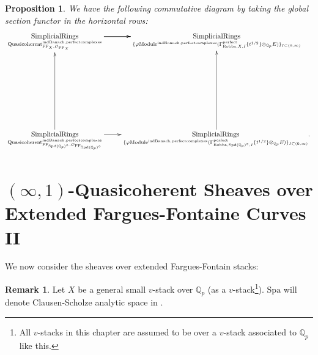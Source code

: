 \documentclass[12pt]{book}
\newtheorem{proposition}{Proposition}
\theoremstyle{definition}
\newtheorem{remark}{Remark}
\begin{document}
\begin{proposition}
We have the following commutative diagram by taking the global section functor in the horizontal rows:\\
\[\displayindent=+0in
\xymatrix@C+0in@R+7pc{
\underset{\mathrm{Quasicoherent}^{\mathrm{indBanach,perfectcomplexes}}_{\mathrm{FF}_X,\mathcal{O}_{\mathrm{FF}_X}}}{\mathrm{SimplicialRings}}  \ar[r] \ar[r] \ar[r] &\underset{\{\varphi\mathrm{Module}^{\mathrm{indBanach,perfectcomplexes}}(\Gamma^\text{perfect}_{\text{Robba},X,I}\{t^{1/2}\}\otimes_{\mathbb{Q}_p}E)\}_{I\subset (0,\infty)}}{\mathrm{SimplicialRings}}   \\
\underset{\mathrm{Quasicoherent}^{\mathrm{indBanach,perfectcomplexes}}_{\mathrm{FF}_{\mathrm{Spd}(\mathbb{Q}_p)^\diamond},\mathcal{O}_{\mathrm{FF}_{\mathrm{Spd}(\mathbb{Q}_p)^\diamond}}}}{\mathrm{SimplicialRings}} \ar[u]\ar[r] &\underset{\{\varphi\mathrm{Module}^{\mathrm{indBanach,perfectcomplexes}}(\Gamma^\text{perfect}_{\text{Robba},{\mathrm{Spd}(\mathbb{Q}_p)^\diamond},I}\{t^{1/2}\}\otimes_{\mathbb{Q}_p}E)\}_{I\subset (0,\infty)}}{\mathrm{SimplicialRings}}.\ar[u]  
}
\]

\end{proposition}





\newpage
\section{$(\infty,1)$-Quasicoherent Sheaves over Extended Fargues-Fontaine Curves II}

\noindent We now consider the sheaves over extended Fargues-Fontain stacks:

\begin{remark}
Let $X$ be a general small $v$-stack over $\mathbb{Q}_p$ (as a $v$-stack\footnote{All $v$-stacks in this chapter are assumed to be over a $v$-stack associated to $\mathbb{Q}_p$ like this.}). $\mathrm{Spa}$ will denote Clausen-Scholze analytic space in \cite{CS2}. 
\end{remark}
\end{document}
